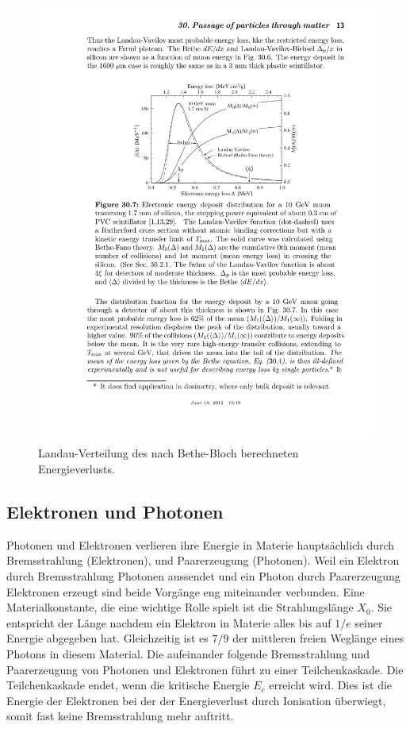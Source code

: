 \begin{figure}
\centering
\includegraphics[]{./input/landau.pdf}\caption{Landau-Verteilung des nach Bethe-Bloch berechneten Energieverlusts.\cite{Passage_through_matter}}\label{fig:landau}
\end{figure}
\subsection{Elektronen und Photonen}\label{sec:emschauer}
Photonen und Elektronen verlieren ihre Energie in Materie hauptsächlich durch Bremsstrahlung (Elektronen), und Paarerzeugung (Photonen). Weil ein Elektron durch Bremsstrahlung Photonen aussendet und ein Photon durch Paarerzeugung Elektronen erzeugt sind beide Vorgänge eng miteinander verbunden. Eine Materialkonstante, die eine wichtige Rolle spielt ist die Strahlungslänge $X_0$. Sie entspricht der Länge nachdem ein Elektron in Materie alles bis auf $1/e$ seiner Energie abgegeben hat. Gleichzeitig ist es $7/9$ der mittleren freien Weglänge eines Photons in diesem Material. Die aufeinander folgende Bremsstrahlung und Paarerzeugung von Photonen und Elektronen führt zu einer Teilchenkaskade. Die Teilchenkaskade endet, wenn die kritische Energie $E_c$ erreicht wird. Dies ist die Energie der Elektronen bei der der Energieverlust durch Ionisation überwiegt, somit fast keine Bremsstrahlung mehr auftritt.

